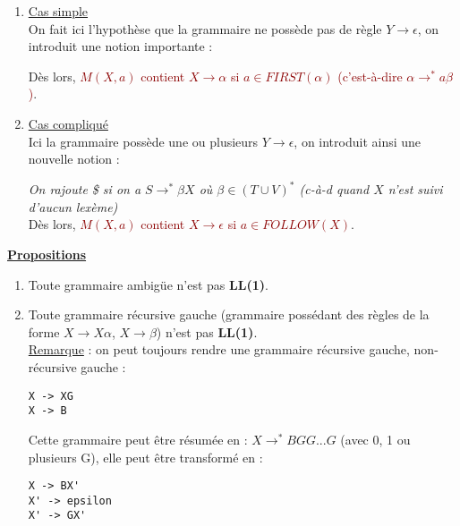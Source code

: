 \documentclass{article}
\newcommand{\red}[1]{\textcolor{darkred}{#1}}
\newcommand{\stitre}[1]{\noindent\textbf{\underline{#1}}}
\begin{document}
\begin{enumerate}
\item \underline{Cas simple} \\
On fait ici l'hypothèse que la grammaire ne possède pas de règle $Y\rightarrow \epsilon$, on introduit une notion importante :
\begin{center}
\end{center}
Dès lors, \red{$M(X,a)$ contient $X\rightarrow \alpha$ si $a\in FIRST(\alpha)$ (c'est-à-dire $\alpha \rightarrow^* a\beta$)}.
\item \underline{Cas compliqué} \\
Ici la grammaire possède une ou plusieurs $Y \rightarrow \epsilon$, on introduit ainsi une nouvelle notion :
\begin{center}
\end{center}
\textit{On rajoute \$ si on a $S\rightarrow^*\beta X$ où $\beta \in (T\cup V)^*$ (c-à-d quand $X$ n'est suivi d'aucun lexème)} \\
Dès lors, \red{$M(X,a)$ contient $X\rightarrow \epsilon$ si $a\in FOLLOW(X)$}.
\end{enumerate}

\stitre{Propositions}
\begin{enumerate}
\item Toute grammaire ambigüe n'est pas \textbf{LL(1)}.
\item Toute grammaire récursive gauche (grammaire possédant des règles de la forme $X\rightarrow X\alpha$, $X \rightarrow \beta$) n'est pas \textbf{LL(1)}.\\
\underline{Remarque} : on peut toujours rendre une grammaire récursive gauche, non-récursive gauche :
\begin{verbatim}
X -> XG
X -> B
\end{verbatim}
Cette grammaire peut être résumée en : $X \rightarrow^* BGG...G$ (avec 0, 1 ou plusieurs G), elle peut être transformé en :
\begin{verbatim}
X -> BX'
X' -> epsilon
X' -> GX'
\end{verbatim}
\end{enumerate}
\end{document}

